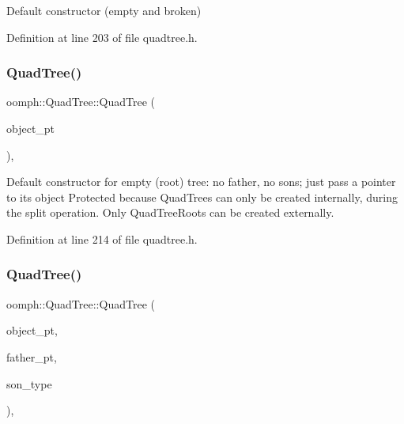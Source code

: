 Default constructor (empty and broken) 



Definition at line 203 of file quadtree.\+h.

\mbox{\label{classoomph_1_1QuadTree_a41f19525579fbf151a0e73eefca43a0b}} 
\subsubsection{\texorpdfstring{Quad\+Tree()}{QuadTree()}\hspace{0.1cm}{\footnotesize\ttfamily [3/4]}}
{\footnotesize\ttfamily oomph\+::\+Quad\+Tree\+::\+Quad\+Tree (\begin{DoxyParamCaption}\item[{\hyperlink{classoomph_1_1RefineableElement}{Refineable\+Element} $\ast$const \&}]{object\+\_\+pt }\end{DoxyParamCaption})\hspace{0.3cm}{\ttfamily [inline]}, {\ttfamily [protected]}}



Default constructor for empty (root) tree\+: no father, no sons; just pass a pointer to its object Protected because Quad\+Trees can only be created internally, during the split operation. Only Quad\+Tree\+Roots can be created externally. 



Definition at line 214 of file quadtree.\+h.

\mbox{\label{classoomph_1_1QuadTree_aef8906aed3a32ba3f7c1723d8dc26015}} 
\subsubsection{\texorpdfstring{Quad\+Tree()}{QuadTree()}\hspace{0.1cm}{\footnotesize\ttfamily [4/4]}}
{\footnotesize\ttfamily oomph\+::\+Quad\+Tree\+::\+Quad\+Tree (\begin{DoxyParamCaption}\item[{\hyperlink{classoomph_1_1RefineableElement}{Refineable\+Element} $\ast$const \&}]{object\+\_\+pt,  }\item[{\hyperlink{classoomph_1_1Tree}{Tree} $\ast$const \&}]{father\+\_\+pt,  }\item[{const int \&}]{son\+\_\+type }\end{DoxyParamCaption})\hspace{0.3cm}{\ttfamily [inline]}, {\ttfamily [protected]}}



